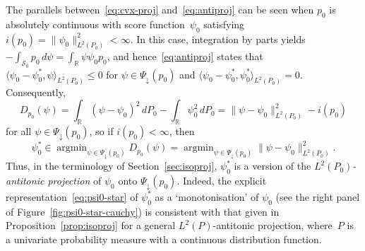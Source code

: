 \documentclass[a4paper]{article}
\newcommand{\R}{\mathbb{R}}
\newcommand{\norm}[1]{\|{#1}\|}
\newcommand{\ipr}[2]{\langle #1, #2 \rangle}
\DeclareMathOperator*{\argmin}{argmin}
\theoremstyle{definition}
\begin{document}
The parallels between~\eqref{eq:cvx-proj} and~\eqref{eq:antiproj} can be seen when $p_0$ is absolutely continuous with score function~$\psi_0$ satisfying $i(p_0) = \norm{\psi_0}_{L^2(P_0)}^2 < \infty$. In this case, integration by parts 
yields $-\int_{\mathcal{S}_0} p_0\,d\psi = \int_\R \psi\psi_0 p_0$,
and hence~\eqref{eq:antiproj} states that $\ipr{\psi_0 - \psi_0^*}{\psi}_{L^2(P_0)} \leq 0$ for $\psi \in \Psi_\downarrow(p_0)$ and $\ipr{\psi_0 - \psi_0^*}{\psi_0^*}_{L^2(P_0)} = 0$.
Consequently,
\[
D_{p_0}(\psi) = \int_\R (\psi - \psi_0)^2\,dP_0 - \int_\R \psi_0^2\,dP_0 = \norm{\psi - \psi_0}_{L^2(P_0)}^2 - i(p_0)
\]
for all $\psi \in \Psi_\downarrow(p_0)$, so if $i(p_0) < \infty$, then
\begin{equation}
\label{eq:Dp0-L2P0}
\psi_0^* \in \argmin_{\psi \in \Psi_\downarrow(p_0)}D_{p_0}(\psi) = \argmin_{\psi \in \Psi_\downarrow(p_0)}\norm{\psi - \psi_0}_{L^2(P_0)}^2.
\end{equation}
Thus, in the terminology of Section~\ref{sec:isoproj}, $\psi_0^*$ is a version of the \textit{$L^2(P_0)$-antitonic projection} of $\psi_0$ onto $\Psi_\downarrow(p_0)$. Indeed, the explicit representation~\eqref{eq:psi0-star} of $\psi_0^*$ as a `monotonisation' of $\psi_0$ (see the right panel of Figure~\ref{fig:psi0-star-cauchy}) is consistent with that given in Proposition~\ref{prop:isoproj} for a general $L^2(P)$-antitonic projection, where~$P$ is a univariate probability measure with a continuous distribution function. 
\end{document}
